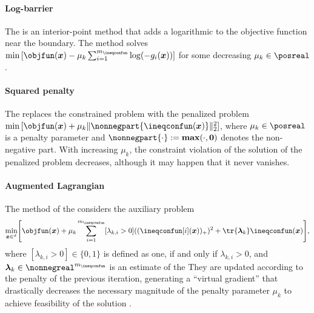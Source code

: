 \paragraph{Log-barrier}

The 
is an interior-point method that adds
a logarithmic  to the objective function
near the boundary.
The method solves
$\min\, [\objfun(\*x) - \mu_k \sum_{i=1}^{m_{\ineqconfun}} \log(-g_i(\*x))]$
for some decreasing $\mu_k \in \posreal$.

\paragraph{Squared penalty}

The 
replaces the constrained problem with the penalized problem
$\min\, [\objfun(\*x) + \mu_k \norm[2]{\nonnegpart{\ineqconfun(\*x)}}^2]$,
where $\mu_k \in \posreal$ is a penalty parameter and
$\nonnegpart{\cdot} := \vecmax(\cdot, \*0)$ denotes the non-negative part.
With increasing $\mu_k$, the constraint violation of the solution of
the penalized problem decreases, although it may happen
that it never vanishes.

\paragraph{Augmented Lagrangian}

The method of the 
considers the auxiliary problem
\begin{equation}
  \min_{\*x \in \real^d} \bracket*{
    \objfun(\*x) + \mu_k \sum_{i=1}^{m_{\ineqconfun}} [\lambda_{k,i} > 0]
    ((\ineqconfun[i](\*x))_{+})^2 + \tr{\*\lambda_k} \ineqconfun(\*x)
  },
\end{equation}
where $[\lambda_{k,i} > 0] \in \{0, 1\}$ is defined as one,
if and only if $\lambda_{k,i} > 0$, and
$\*\lambda_k \in \nonnegreal^{m_{\ineqconfun}}$ is an estimate of the
They are updated according to the penalty of the previous iteration,
generating a ``virtual gradient'' that drastically decreases
the necessary magnitude of the penalty parameter $\mu_k$
to achieve feasibility of the solution \cite{Toussaint15Introduction}.

